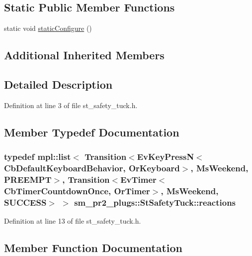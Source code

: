 \subsection*{Static Public Member Functions}
\begin{DoxyCompactItemize}
\item 
static void \hyperlink{structsm__pr2__plugs_1_1StSafetyTuck_a0682a377d9ef4f79963011de6e3acc9d}{static\+Configure} ()
\end{DoxyCompactItemize}
\subsection*{Additional Inherited Members}


\subsection{Detailed Description}


Definition at line 3 of file st\+\_\+safety\+\_\+tuck.\+h.



\subsection{Member Typedef Documentation}
\subsubsection[{\texorpdfstring{reactions}{reactions}}]{\setlength{\rightskip}{0pt plus 5cm}typedef mpl\+::list$<$ Transition$<$Ev\+Key\+PressN$<$Cb\+Default\+Keyboard\+Behavior, {\bf Or\+Keyboard}$>$, {\bf Ms\+Weekend}, {\bf P\+R\+E\+E\+M\+PT}$>$, Transition$<$Ev\+Timer$<$Cb\+Timer\+Countdown\+Once, {\bf Or\+Timer}$>$, {\bf Ms\+Weekend}, {\bf S\+U\+C\+C\+E\+SS}$>$ $>$ {\bf sm\+\_\+pr2\+\_\+plugs\+::\+St\+Safety\+Tuck\+::reactions}}\hypertarget{structsm__pr2__plugs_1_1StSafetyTuck_a73fb9b6d46048be9361072d6c72939a3}{}\label{structsm__pr2__plugs_1_1StSafetyTuck_a73fb9b6d46048be9361072d6c72939a3}


Definition at line 13 of file st\+\_\+safety\+\_\+tuck.\+h.



\subsection{Member Function Documentation}
